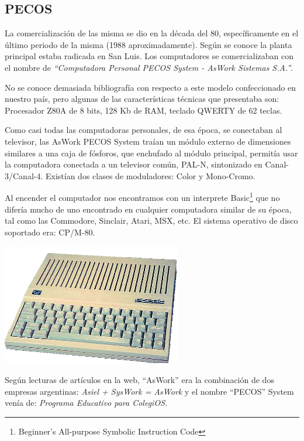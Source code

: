 \documentclass[%
  	final,
%
	notitlepage,
	narroweqnarray,
	inline,
 	twoside,
	]{ieee}
\begin{document}
\subsection*{PECOS}

La comercializaci\'on de las misma se dio en la d\'ecada del 80, espec\'ificamente en el \'ultimo periodo de la misma (1988 aproximadamente). Seg\'un se conoce la planta principal estaba radicada en San Luis. Los computadores se comercializaban con el nombre de \textit{``Computadora Personal PECOS System - AsWork Sistemas S.A.''}.

No se conoce demasiada bibliograf\'ia con respecto a este modelo confeccionado en nuestro pa\'is, pero algunas de las caracter\'isticas t\'ecnicas que presentaba son: Procesador Z80A de 8 bits, 128 Kb de RAM, teclado QWERTY de 62 teclas. 

Como casi todas las computadoras personales, de esa \'epoca, se conectaban al televisor, las AsWork PECOS System\cite{pecos} tra\'ian un m\'odulo externo de dimensiones similares a una caja de f\'osforos, que enchufado al m\'odulo principal, permit\'ia usar la computadora conectada a un televisor com\'un, PAL-N, sintonizado en Canal-3/Canal-4. Exist\'ian dos clases de moduladores: Color y Mono-Cromo. 

Al encender el computador nos encontramos con un interprete Basic\footnote{Beginner's All-purpose Symbolic Instruction Code} que no difer\'ia mucho de uno encontrado en cualquier computadora similar de su \'epoca, tal como las Commodore, Sinclair, Atari, MSX, etc. El sistema operativo de disco soportado era: CP/M-80.

\begin{center}\includegraphics[width=222pt, height=150pt]{pecos.png}\end{center}

Seg\'un lecturas de art\'iculos en la web\cite{pecos}, ``AsWork'' era la combinaci\'on de dos empresas argentinas: \textit{Asiel + SysWork = AsWork} y el nombre ``PECOS'' System ven\'ia de: \textit{Programa Educativo para ColegiOS.}
\end{document}
